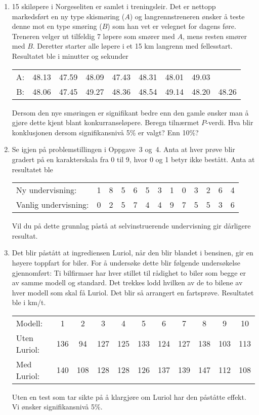 \begin{enumerate}
\item
15 skiløpere i Norgeseliten er samlet i treningsleir.  Det er nettopp
mar\-keds\-ført en ny type skismøring ($A$) og langrennstreneren
ønsker å teste denne mot en type smøring ($B$) som han vet
er velegnet for dagens føre.  Treneren velger ut tilfeldig 7
løpere som smører med $A$, mens resten smører med $B$.  Deretter
starter alle løpere i et 15 km langrenn med fellesstart.  Resultatet
ble i minutter og sekunder
\begin{center}
\begin{tabular}{ccccccccc}
A:  &  48.13 & 47.59 & 48.09 & 47.43 & 48.31 & 48.01 & 49.03 &       \\
B:  &  48.06 & 47.45 & 49.27 & 48.36 & 48.54 & 49.14 & 48.20 & 48.26
\end{tabular}
\end{center}
Dersom den nye smøringen er signifikant bedre enn den gamle ønsker
man å gjøre dette kjent blant konkurranseløpere.  Beregn
tilnærmet $P$-verdi.  Hva blir konklusjonen dersom signifikansnivå
5\% er valgt?  Enn 10\%?

\item
Se igjen på problemstillingen i Oppgave~3 og~4.  Anta at hver
prøve blir gradert på en karakterskala fra 0 til 9, hvor 0 og
1 betyr ikke bestått.  Anta at resultatet ble

\begin{center}
\begin{tabular}{lcccccccccccc}
Ny undervisning:     &  1 & 8 & 5 & 6 & 5 & 3 & 1 & 0 & 3 & 2 & 6 & 4 \\
Vanlig undervisning: &  0 & 2 & 5 & 7 & 4 & 4 & 9 & 7 & 5 & 5 & 3 & 6
\end{tabular}
\end{center}
Vil du på dette grunnlag påstå at selvinstruerende 
undervisning gir dårligere resultat.

\item
Det blir påstått at ingrediensen Luriol, når den blir
blandet i bensinen, gir en høyere toppfart for biler.  For å
undersøke dette blir følgende undersøkelse gjennomført:
Ti bilfirmaer har hver stillet til rådighet to biler som begge
er av samme modell og standard.  Det trekkes lodd hvilken av de to
bilene av hver modell som skal få Luriol.  Det blir så
arrangert en fartsprøve.  Resultatet ble i km/t.
\begin{center} \addtolength{\tabcolsep}{-0.2\tabcolsep}
\begin{tabular}{lcccccccccc} 
Modell:     &  1  &  2  &  3  &  4  &  5  &  6  &  7  &  8  &  9  &  10 \\
Uten Luriol:& 136 &  94 & 127 & 125 & 133 & 124 & 127 & 138 & 103 & 113 \\
Med Luriol: & 140 & 108 & 128 & 128 & 126 & 137 & 139 & 147 & 112 & 108
\end{tabular}
\end{center}
Uten en test som tar sikte på å klargjøre om Luriol har
den påståtte effekt.  Vi ønsker signifikansnivå 5\%.


\end{enumerate}
